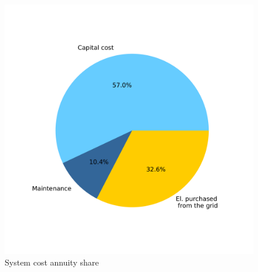\documentclass[english]{SPFShortReport}
\begin{document}
\begin{figure}[!htbp]
\begin{center}
\includegraphics[width=1\textwidth]{costShareAnnuity-System6_SolarIce_MFH30_flatPlate_HP20-CHE_tmy-Ac50-Vice20.pdf}
\caption{System cost annuity share}
\label{systemCostannuity}
\end{center}
\end{figure}
\end{document}
